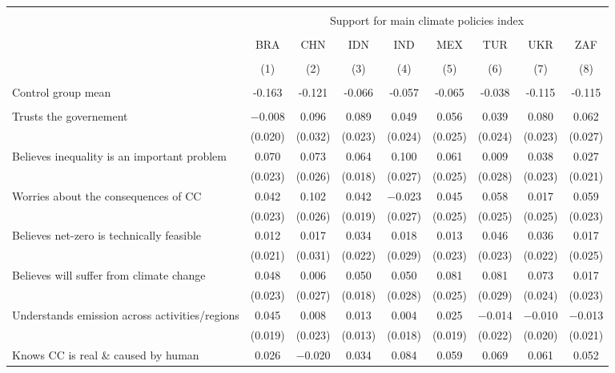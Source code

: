 
\begin{tabular}{@{\extracolsep{5pt}}lcccccccc} 
\\[-1.8ex]\hline 
\hline \\[-1.8ex] 
 & \multicolumn{8}{c}{Support for main climate policies index} \\ 
\cline{2-9} 
\\[-1.8ex] & BRA & CHN & IDN & IND & MEX & TUR & UKR & ZAF \\ 
\\[-1.8ex] & (1) & (2) & (3) & (4) & (5) & (6) & (7) & (8)\\ 
\hline \\[-1.8ex] 
Control group mean & -0.163 & -0.121 & -0.066 & -0.057 & -0.065 & -0.038 & -0.115 & -0.115  \\ \hline \\[-1.8ex]
 Trusts the governement & $-$0.008 & 0.096 & 0.089 & 0.049 & 0.056 & 0.039 & 0.080 & 0.062 \\ 
  & (0.020) & (0.032) & (0.023) & (0.024) & (0.025) & (0.024) & (0.023) & (0.027) \\ 
  Believes inequality is an important problem & 0.070 & 0.073 & 0.064 & 0.100 & 0.061 & 0.009 & 0.038 & 0.027 \\ 
  & (0.023) & (0.026) & (0.018) & (0.027) & (0.025) & (0.028) & (0.023) & (0.021) \\ 
  Worries about the consequences of CC & 0.042 & 0.102 & 0.042 & $-$0.023 & 0.045 & 0.058 & 0.017 & 0.059 \\ 
  & (0.023) & (0.026) & (0.019) & (0.027) & (0.025) & (0.025) & (0.025) & (0.023) \\ 
  Believes net-zero is technically feasible & 0.012 & 0.017 & 0.034 & 0.018 & 0.013 & 0.046 & 0.036 & 0.017 \\ 
  & (0.021) & (0.031) & (0.022) & (0.029) & (0.023) & (0.023) & (0.022) & (0.025) \\ 
  Believes will suffer from climate change & 0.048 & 0.006 & 0.050 & 0.050 & 0.081 & 0.081 & 0.073 & 0.017 \\ 
  & (0.023) & (0.027) & (0.018) & (0.028) & (0.025) & (0.029) & (0.024) & (0.023) \\ 
  Understands emission across activities/regions & 0.045 & 0.008 & 0.013 & 0.004 & 0.025 & $-$0.014 & $-$0.010 & $-$0.013 \\ 
  & (0.019) & (0.023) & (0.013) & (0.018) & (0.019) & (0.022) & (0.020) & (0.021) \\ 
  Knows CC is real \& caused by human & 0.026 & $-$0.020 & 0.034 & 0.084 & 0.059 & 0.069 & 0.061 & 0.052 \\ 

\end{tabular}
